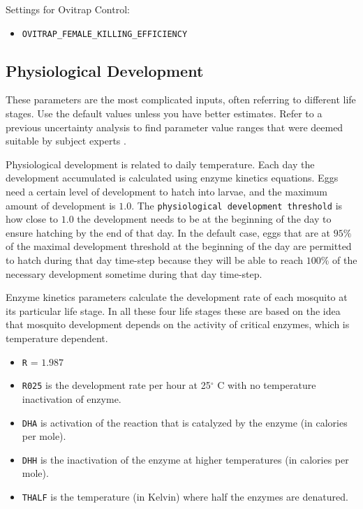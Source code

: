 \documentclass[11pt]{article}
\newcommand{\linecmd}[1]{\texttt{#1}}
\begin{document}
Settings for Ovitrap Control:
\begin{itemize}
	\item \linecmd{OVITRAP\_FEMALE\_KILLING\_EFFICIENCY}
\end{itemize}

\subsection{Physiological Development}
These parameters are the most complicated inputs, often referring to different life stages. Use the default values unless you have better estimates. Refer to a previous uncertainty analysis to find parameter value ranges that were deemed suitable by subject experts \cite{xu2010understanding}.

Physiological development is related to daily temperature. Each day the development accumulated is calculated using enzyme kinetics equations. Eggs need a certain level of development to hatch into larvae, and the maximum amount of development is $1.0$. The \linecmd{physiological development threshold} is how close to $1.0$ the development needs to be at the beginning of the day to ensure hatching by the end of that day. In the default case, eggs that are at $95\%$ of the maximal development threshold at the beginning of the day are permitted to hatch during that day time-step because they will be able to reach $100\%$ of the necessary development sometime during that day time-step.

Enzyme kinetics parameters calculate the development rate of each mosquito at its particular life stage. In all these four life stages these are based on the idea that mosquito development depends on the activity of critical enzymes, which is temperature dependent.
\begin{itemize}
	\item \linecmd{R} = $1.987$
	\item \linecmd{R025} is the development rate per hour at 25$^\circ$ C with no temperature inactivation of enzyme.
	\item \linecmd{DHA} is activation of the reaction that is catalyzed by the enzyme (in calories per mole).
	\item \linecmd{DHH} is the inactivation of the enzyme at higher temperatures (in calories per mole).
	\item \linecmd{THALF} is the temperature (in Kelvin) where half the enzymes are denatured.
\end{itemize}
\end{document}
